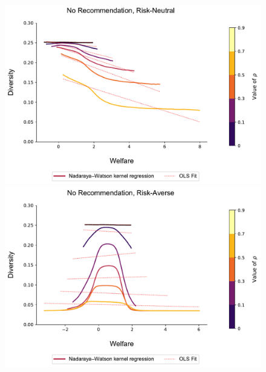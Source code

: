 \documentclass[sigconf]{acmart}
\begin{document}
\begin{figure}[t]
\includegraphics[width=1.05\linewidth]{figures/diversity_welfare_rn.pdf}\\
\includegraphics[width=1.05\linewidth]{figures/diversity_welfare_ra.pdf}\\
\label{fig:diversity_welfare_ra}
\end{figure}
\end{document}
